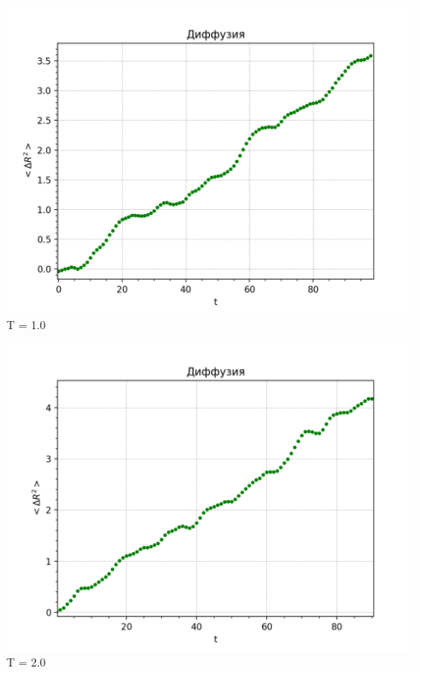 \begin{minipage}{0.47\textwidth}
    \begin{center}
        \includegraphics[width=\linewidth]{11.png}\\
        T = 1.0
    \end{center}
   
\end{minipage}
\begin{minipage}{0.47\textwidth}
    \begin{center}
        \includegraphics[width=\linewidth]{12.png}\\
        T = 2.0
    \end{center}
\end{minipage}


